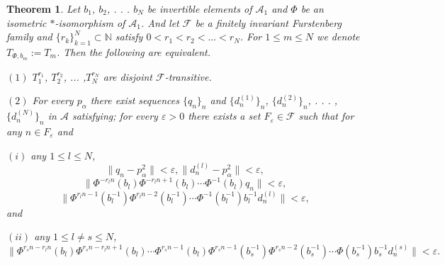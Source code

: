 \documentclass[10pt,a4paper]{amsart}
\newtheorem{theorem}{Theorem}
\begin{document}
\begin{theorem}\label{the4.1}
Let $b_{1}$, $b_{2}$, . . . $b_{N}$ be invertible elements of $\mathcal{A}_{1}$ and $\Phi$ be an isometric $\ast$-isomorphism of $\mathcal{A}_{1}$. And let $\mathcal{F}$ be a finitely invariant Furstenberg family and $\{r_{k}\}^{N}_{k=1}\subset \mathbb{N}$ satisfy $0<r_{1}<r_{2}<...<r_{N}$. For $1\leq m\leq N$ we denote $T_{\Phi, b_{m}}:=T_{m}$. Then the following are equivalent.

$(1)$ $T^{r_{1}}_{1}$, $T^{r_{2}}_{2}$, ... ,$T^{r_{N}}_{N}$ are disjoint $\mathcal{F}$-transitive.

$(2)$ For every $p_{\alpha}$ there exist sequences $\{q_{n}\}_{n}$ and $\{d^{(1)}_{n}\}_{n}$, $\{d^{(2)}_{n}\}_{n}$, . . . , $\{d^{(N)}_{n}\}_{n}$ in $\mathcal{A}$ satisfying;
for every $\varepsilon>0$ there exists a set $F_{\varepsilon}\in\mathcal{F}$ such that  for any $n\in F_{\varepsilon}$ and

$(i)$ any $1\leq l\leq N$,
\[\|q_{n}-p^{2}_{\alpha}\|<\varepsilon, \|d^{(l)}_{n}-p^{2}_{\alpha}\|<\varepsilon,\]
\[\|\Phi^{-r_{l}n}(b_{l})\Phi^{-r_{l}n+1}(b_{l})\cdots \Phi^{-1}(b_{l})q_{n}\|<\varepsilon,\]
\[\|\Phi^{r_{l}n-1}(b^{-1}_{l})\Phi^{r_{l}n-2}(b^{-1}_{l})\cdots\Phi^{-1}(b^{-1}_{l})b^{-1}_{l}d^{(l)}_{n}\|<\varepsilon,\]
and

$(ii)$ any $1\leq l\neq s \leq N$,
\[\|\Phi^{r_{s}n-r_{l}n}(b_{l})\Phi^{r_{s}n-r_{l}n+1}(b_{l})\cdots\Phi^{r_{s}n-1}(b_{l})\Phi^{r_{s}n-1}(b^{-1}_{s})\Phi^{r_{s}n-2}(b^{-1}_{s})\cdots \Phi(b^{-1}_{s})b^{-1}_{s}d^{(s)}_{n}\|<\varepsilon.\]
\end{theorem}
\end{document}
